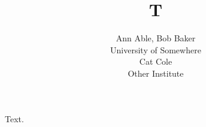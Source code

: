 \documentclass{llncs}
\begin{document}
\title{T}
\author{Ann Able, Bob Baker\\ University of Somewhere\\ Cat Cole\\ Other Institute}
\maketitle
Text.
\end{document}
